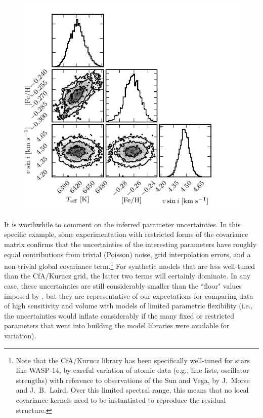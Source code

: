 \documentclass[iop,floatfix,numberedappendix,twocolappendix]{emulateapj}
\begin{document}
\begin{figure}[!b]
  \includegraphics{figs/Kurucz_triangle.pdf}
\vspace{-0.5cm}
\end{figure}

It is worthwhile to comment on the inferred parameter uncertainties.  In this specific example, 
some experimentation with restricted forms of the covariance matrix confirms that the uncertainties 
of the interesting parameters have roughly equal contributions from trivial (Poisson) noise, grid 
interpolation errors, and a non-trivial global covariance term.\footnote{Note that the {\sc 
CfA/Kurucz} library has been specifically well-tuned for stars like WASP-14, by careful variation 
of atomic data (e.g., line lists, oscillator strengths) with reference to observations of the Sun 
and Vega, by J.~Morse and J.~B.~Laird.  Over this limited spectral range, this means that no local 
covariance kernels need to be instantiated to reproduce the residual structure.}  For synthetic 
models that are less well-tuned than the {\sc CfA/Kurucz} grid, the latter two terms will certainly 
dominate.  In any case, these uncertainties are still considerably smaller than the ``floor" values 
imposed by \citet{torres12}, but they are representative of our expectations for comparing data of 
high sensitivity and volume with models of limited parametric flexibility (i.e., the uncertainties 
would inflate considerably if the many fixed or restricted parameters that went into building the 
model libraries were available for variation).  
\end{document}
